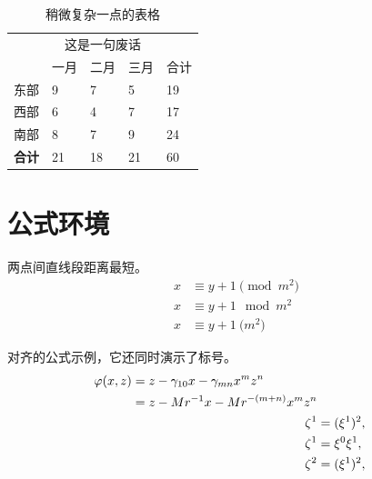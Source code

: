 \documentclass[
    bachelor, 
    ]{xjtuthesis}
\begin{document}
            \begin{table}[h!]
              \centering
              \caption{稍微复杂一点的表格}
              \label{tab:complex}
              \wuhao
              \begin{tabularx}{\linewidth}{XXXXX} \toprule 
                    & \multicolumn{3}{c}{这是一句废话} &  \\ \cmidrule{2-4}
                    & 一月 & 二月 & 三月 & 合计 \\ \midrule
               东部 &    9 &    7 &    5 &   19 \\ 
               西部 &    6 &    4 &    7 &   17 \\ 
               南部 &    8 &    7 &    9 &   24 \\ 
           \bf 合计 &   21 &   18 &   21 &   60 \\ \bottomrule
              \end{tabularx}
            \end{table}


    \chapter{公式环境}

            \begin{axiom}
                \rm 两点间直线段距离最短。  
                \begin{align}
                    x&\equiv y+1\pmod{m^2}\\
                    x&\equiv y+1\mod{m^2}\\
                    x&\equiv y+1\pod{m^2}
                \end{align}
            \end{axiom}

            \begin{remark}
            \rm 对齐的公式示例，它还同时演示了标号。
            \begin{align}
            \begin{split} 
            \varphi(x,z)
            &=z-\gamma_{10}x-\gamma_{mn}x^mz^n\\
            &=z-Mr^{-1}x-Mr^{-(m+n)}x^mz^n
            \end{split} \notag \\
            \noindent\zeta^1&=(\xi^1)^2,\\
            \zeta^1 &=\xi^0\xi^1,\\
            \zeta^2 &=(\xi^1)^2,
            \end{align}
            \end{remark}
\end{document}

